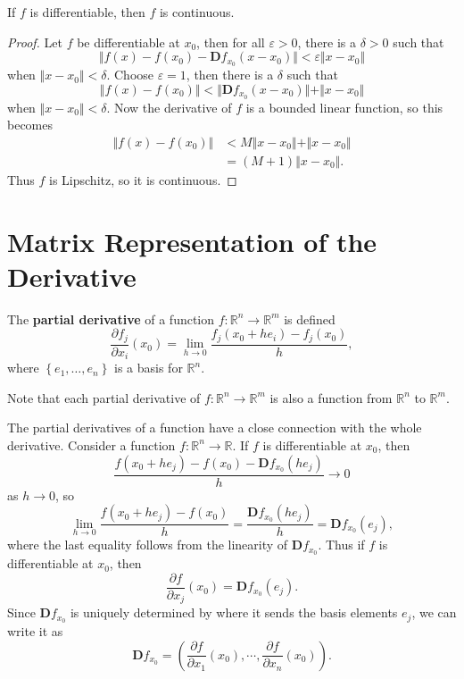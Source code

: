 \documentclass[twoside,10pt]{report}
\begin{document}
\begin{prop}
	If $f$ is differentiable, then $f$ is continuous.
\end{prop}
\begin{proof}
	Let $f$ be differentiable at $x_0$, then for all $\varepsilon > 0$, there is a $\delta > 0$ such that
	\[
		\Vert{f(x) - f(x_0) - \mathbf{D}f_{x_0}(x-x_0)}\Vert < \varepsilon \Vert{x-x_0}\Vert
	\] when $\Vert{x-x_0}\Vert< \delta$. Choose $\varepsilon = 1$, then there is a $\delta$ such that
	\[
		\Vert{f(x) - f(x_0)}\Vert < \Vert{\mathbf{D}f_{x_0}(x-x_0)}\Vert+ \Vert{x-x_0}\Vert
	\] when $\Vert{x-x_0}\Vert< \delta$. Now the derivative of $f$ is a bounded linear function, so this becomes
	\begin{align*}
		\Vert{f(x) - f(x_0)}\Vert &< M \Vert{x-x_0}\Vert+ \Vert{x-x_0}\Vert \\
					  &= (M+1) \Vert{x-x_0}\Vert.
	\end{align*}
	Thus $f$ is Lipschitz, so it is continuous.
\end{proof}



\section{Matrix Representation of the Derivative}

\begin{defn}[]
The \textbf{partial derivative} of a function $f:\mathbb{R}^n \to \mathbb{R}^m$ is defined
\[
	\frac{\partial f_j}{\partial x_i} (x_0) = \lim_{h \to 0} \frac{f_j(x_0 + h e_i) - f_j(x_0)}{h},
\] where $\left\{ e_1, \dots, e_n \right\}$ is a basis for $\mathbb{R}^n$.
\end{defn}

Note that each partial derivative of $f: \mathbb{R}^n \to \mathbb{R}^m$ is also a function from $\mathbb{R}^n$ to $\mathbb{R}^m$.

The partial derivatives of a function have a close connection with the whole derivative. Consider a function $f: \mathbb{R}^n \to \mathbb{R}$. If $f$ is differentiable at $x_0$, then
\[
	\frac{f(x_0+he_j) - f(x_0) - \mathbf{D}f_{x_0}(he_j)}{h} \to 0
\] as $h \to 0$, so
\[
	\lim_{h \to 0} \frac{f(x_0+he_j) - f(x_0)}{h} = \frac{\mathbf{D}f_{x_0}(he_j)}{h} = \mathbf{D}f_{x_0}(e_j),
\] where the last equality follows from the linearity of $\mathbf{D}f_{x_0}$. Thus if $f$ is differentiable at $x_0$, then
\[
	\frac{\partial f}{\partial x_j}(x_0) = \mathbf{D}f_{x_0}(e_j).
\] Since $\mathbf{D}f_{x_0}$ is uniquely determined by where it sends the basis elements $e_j$, we can write it as
\[
	\mathbf{D}f_{x_0} = \left( \frac{\partial f}{\partial x_1} (x_0), \cdots, \frac{\partial f}{\partial x_n} (x_0) \right).
\] 
\end{document}
